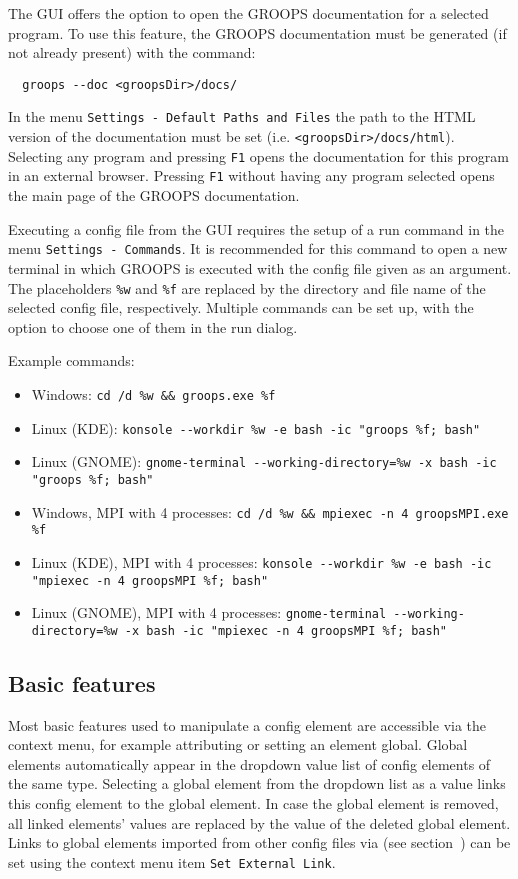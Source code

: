 The GUI offers the option to open the GROOPS documentation for a selected program. To use this feature,
the GROOPS documentation must be generated (if not already present) with the command:
\begin{verbatim}
  groops --doc <groopsDir>/docs/
\end{verbatim}
In the menu \verb|Settings - Default Paths and Files| the path to the HTML version of the documentation must be set (i.e. \verb|<groopsDir>/docs/html|).
Selecting any program and pressing \verb|F1| opens the documentation for this program in an external browser.
Pressing \verb|F1| without having any program selected opens the main page of the GROOPS documentation.

Executing a config file from the GUI requires the setup of a run command in the menu \verb|Settings - Commands|.
It is recommended for this command to open a new terminal in which GROOPS is executed with the config file given as an argument.
The placeholders \verb|%w| and \verb|%f| are replaced by the directory and file name of the selected config file, respectively.
Multiple commands can be set up, with the option to choose one of them in the run dialog.

Example commands:
\begin{itemize}
	\item Windows: \verb|cd /d %w && groops.exe %f|
	\item Linux (KDE): \verb|konsole --workdir %w -e bash -ic "groops %f; bash"|
	\item Linux (GNOME): \verb|gnome-terminal --working-directory=%w -x bash -ic "groops %f; bash"|
	\item Windows, MPI with 4 processes: \verb|cd /d %w && mpiexec -n 4 groopsMPI.exe %f|
	\item Linux (KDE), MPI with 4 processes: \verb|konsole --workdir %w -e bash -ic "mpiexec -n 4 groopsMPI %f; bash"|
	\item Linux (GNOME), MPI with 4 processes: \verb|gnome-terminal --working-directory=%w -x bash -ic "mpiexec -n 4 groopsMPI %f; bash"|
\end{itemize}

\subsection{Basic features}

Most basic features used to manipulate a config element are accessible via the context menu,
for example attributing  or setting an element global.
Global elements automatically appear in the dropdown value list of config elements of the same type.
Selecting a global element from the dropdown list as a value links this config element to the global element.
In case the global element is removed, all linked elements' values are replaced by the value of the deleted global element.
Links to global elements imported from other config files via 
(see section~) can be set using the context menu item \verb|Set External Link|.

